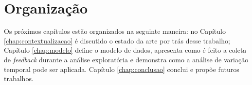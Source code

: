 \section{Organização}

Os próximos capítulos estão organizados na seguinte maneira: no Capítulo \ref{chap:contextualizacao} é discutido o estado da arte por trás desse trabalho; Capítulo \ref{chap:modelo} define o modelo de dados, apresenta como é feito a coleta de {\em feedback} durante a análise exploratória e demonstra como a análise de variação temporal pode ser aplicada. Capítulo \ref{chap:conclusao} conclui e propõe futuros trabalhos.
